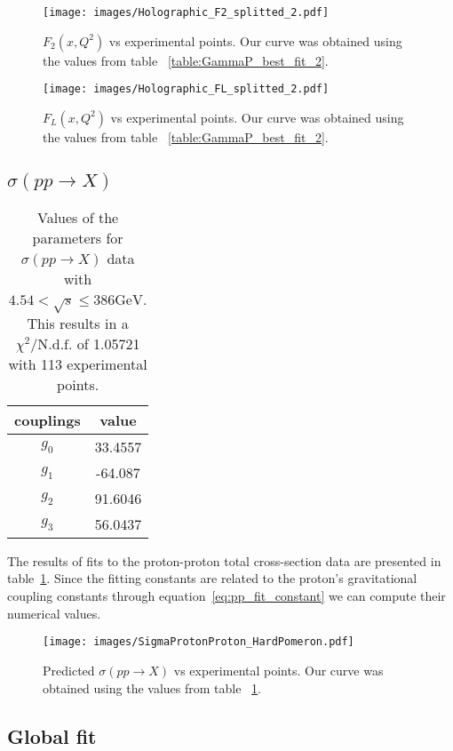 \documentclass[preprint, 12pt]{elsarticle}
\begin{document}
\begin{figure}[!h]
\center
\texttt{[image: images/Holographic\_F2\_splitted\_2.pdf]} 
\caption{$F_2\left(x,Q^2\right)$ vs experimental points. Our curve was obtained using the values from table ~\ref{table:GammaP_best_fit_2}.}
\label{fig:F2_best_fit_2}
\end{figure}

\begin{figure}[!h]
\center
\texttt{[image: images/Holographic\_FL\_splitted\_2.pdf]} 
\caption{$F_L\left(x,Q^2\right)$ vs experimental points. Our curve was obtained using the values from table ~\ref{table:GammaP_best_fit_2}.}
\label{fig:FL_best_fit_2}
\end{figure}

\subsection{$\sigma\left( p p \rightarrow X\right)$}

\begin{table}[b!]
\centering
\caption{Values of the parameters for $\sigma\left(p p \rightarrow X\right)$ data with $4.54 < \sqrt{s} \leq 386 \text{GeV}$. This results in a $\chi^2 / \text{N.d.f.}$ of 1.05721 with 113 experimental points.}
\vspace{0.5cm}
\begin{tabular}{|c|c|}
\hline
couplings   & value \\
\hline
$g_0$  & 33.4557\\ 
\hline
$g_1$  & -64.087 \\ 
\hline
$g_2$  & 91.6046  \\
\hline
$g_3$  & 56.0437\\ 
\hline
\end{tabular}
\label{table:SigmaPP_best_fit}
\end{table}

The results of fits to the proton-proton total cross-section data are presented in table~\ref{table:SigmaPP_best_fit}. Since the fitting constants are related to the proton's gravitational coupling constants through equation~\ref{eq:pp_fit_constant} we can compute their numerical values.

\begin{figure}[!h]
\center
\texttt{[image: images/SigmaProtonProton\_HardPomeron.pdf]} 
\caption{Predicted $\sigma\left(p p \rightarrow X\right)$ vs experimental points. Our curve was obtained using the values from table ~\ref{table:SigmaPP_best_fit}.}
\label{fig:SigmaPP_best_fit}
\end{figure}

\subsection{Global fit}





\end{document}
